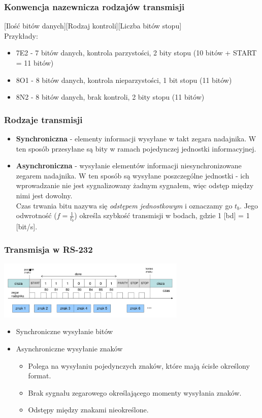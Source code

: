 \documentclass[a4paper,twoside]{article}
\begin{document}
		\subsubsection{Konwencja nazewnicza rodzajów transmisji}
			[Ilość bitów danych][Rodzaj kontroli][Liczba bitów stopu]\\Przykłady:
			\begin{itemize}
				\item 7E2 - 7 bitów danych, kontrola parzystości, 2 bity stopu (10 bitów + START = 11 bitów)
				\item 8O1 - 8 bitów danych, kontrola nieparzystości, 1 bit stopu (11 bitów)
				\item 8N2 - 8 bitów danych, brak kontroli, 2 bity stopu (11 bitów)
			\end{itemize}
		\subsubsection{Rodzaje transmisji}
		\begin{itemize}
			\item \textbf{Synchroniczna} - elementy informacji wysyłane w takt zegara nadajnika. W ten sposób przesyłane są bity w ramach pojedynczej jednostki informacyjnej.
			\item \textbf{Asynchroniczna} - wysyłanie elementów informacji niesynchronizowane zegarem nadajnika. W ten sposób są wysyłane poszczególne jednostki - ich wprowadzanie nie jest sygnalizowany żadnym sygnałem, więc odstęp między nimi jest dowolny.\\
			Czas trwania bitu nazywa się \emph{odstępem jednostkowym} i oznaczamy go $t_{b}$. Jego odwrotność ($f=\frac{1}{t_{b}}$) określa szybkość transmisji w bodach, gdzie 1 [bd] = 1 [bit/s].
		\end{itemize}
		\subsubsection{Transmisja w RS-232}
		\includegraphics[width=9cm]{./wyklady/RS232_4_1.pdf}
		\begin{itemize}
			\item Synchroniczne wysyłanie bitów
			\item Asynchroniczne wysyłanie znaków
			\begin{itemize}
				\item Polega na wysyłaniu pojedynczych znaków, które mają ścisłe określony format.
				\item Brak sygnału zegarowego określającego momenty wysyłania znaków.
				\item Odstępy między znakami nieokreślone.
			\end{itemize}
		\end{itemize}
\end{document}
